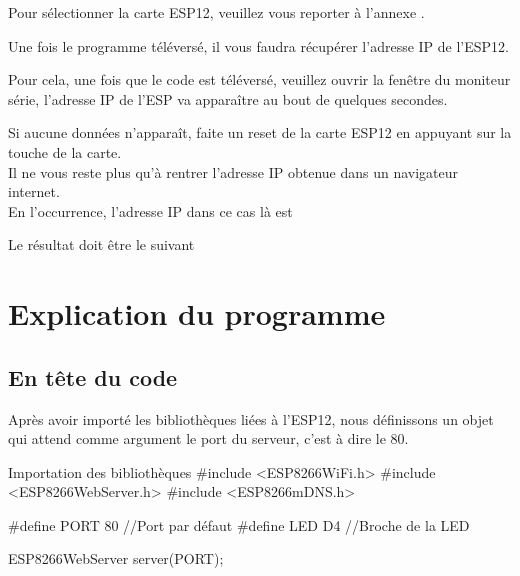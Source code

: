Pour sélectionner la carte ESP12, veuillez vous reporter à l'annexe .


Une fois le programme téléversé, il vous faudra récupérer l'adresse IP de l'ESP12.


Pour cela, une fois que le code est téléversé, veuillez ouvrir la fenêtre du moniteur série, l’adresse IP de l'ESP va apparaître 
au bout de quelques secondes.\\


Si aucune données n’apparaît, faite un reset de la carte ESP12 en appuyant sur la touche  de la carte.\\

Il ne vous reste plus qu'à rentrer l’adresse IP obtenue dans un navigateur internet.\\
En l’occurrence, l'adresse IP dans ce cas là est 


Le résultat doit être le suivant \\


\section{Explication du programme}


\subsection{En tête du code}

Après avoir importé les bibliothèques liées à l'ESP12, nous définissons un objet  qui attend 
comme argument le port du serveur, c'est à dire le 80.
\begin{Cpp}{Importation des bibliothèques}
#include <ESP8266WiFi.h>
#include <ESP8266WebServer.h>
#include <ESP8266mDNS.h>
        
#define PORT 80 //Port par défaut
#define LED D4  //Broche de la LED
        
ESP8266WebServer server(PORT);
\end{Cpp}


